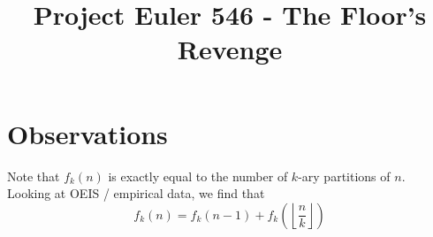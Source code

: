 \documentclass{article}
\title{Project Euler 546 - The Floor's Revenge}
\begin{document}
\maketitle

\section{Observations}
Note that $f_k(n)$ is exactly equal to the number of $k$-ary partitions of $n$.  Looking at OEIS / empirical data, we find that
\[
 f_k(n) = f_k(n-1) + f_k \left (\left \lfloor \frac{n}{k} \right \rfloor \right)
\]
\end{document}
